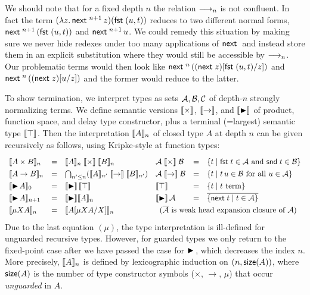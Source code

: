 We should note that for a fixed depth $n$ the relation $\red_n$ is not
confluent. In fact the term $(\lambda z. \, \pure^{n+1} \, z) (\fst (u , t))$ 
reduces to two different normal forms, $\pure^{n+1} \, (\fst (u , t))$ and $\pure^{n+1} \, u$.
We could remedy this situation by making sure we never hide redexes
under too many applications of $\pure$ and instead store them in an explicit
substitution where they would still be accessible by $\red_n$.
Our problematic terms would then look like $\pure^{n} \, (\subst {\fst (u , t)} z {(\pure z)})$ 
and $\pure^{n} \, (\subst u z {(\pure z)})$ and the former would reduce
to the latter.


To show termination, we interpret types as sets $\A,\B,\C$ of
depth-$n$ strongly normalizing terms.
We define semantic versions $\semtimes$,
$\semto$, and $\semlater$ of product, function space, and delay type
constructor, plus a terminal (=largest) semantic type $\semtop$.  Then
the interpretation $\Den A n$ of closed type $A$ at depth $n$ can be given
recursively as follows, using Kripke-style at function types:
\[
\def\arraystretch{1.3}
\begin{array}{lll@{\quad}lll}
  \Den{A \times B}n & = & \Den A n \semtimes \Den B n
  &
  \A \semtimes \B & = & \{ t \mid \fst t \in \A \mand \snd t \in \B \}
\\
  \Den{A \to B}n & = & \bigcap_{n' \leq n} (\Den A {n'} \semto \Den B {n'})
  &
  \A \semto \B & = & \{ t \mid t\,u \in \B \mforall u \in \A \}
\\
  \Den{\later A}0 & = & \semlater \semtop
  &
  \semtop & = & \{ t \mid t \mbox{ term} \}
\\
  \Den{\later A}{n+1} & = & \semlater \Den A n
  &
  \semlater \A & = & \overline{\{ \pure t \mid t \in \A \}}
\\
  \Den{\mu X A}n & = & \Den{\subst{\mu X A}X A}n
  &
  \multicolumn 3 l {(\overline\A \mbox{ is weak head expansion closure
      of } \A)}
\\
\end{array}
\]
%
Due to the last equation $(\mu)$, the type interpretation is ill-defined for
unguarded recursive types.  However, for guarded types we only return
to the fixed-point case after we have passed the case for $\later$,
which decreases the index $n$.  More precisely, $\Den A n$ is defined by
lexicographic induction on $(n, \tsize(A))$, where $\tsize(A)$ is the
number of type constructor symbols ($\times$, $\to$, $\mu$)
that occur \emph{unguarded} in $A$.

